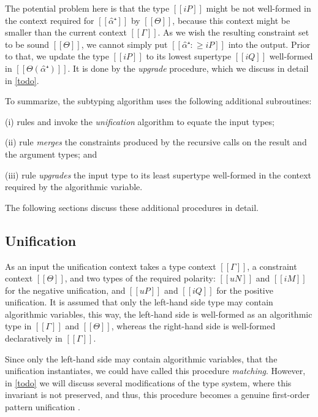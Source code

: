 The potential problem here is that the type $[[iP]]$
might be not well-formed in the context required for $[[α̂⁺]]$ by $[[Θ]]$, 
because this context might be smaller than the current context $[[Γ]]$.
As we wish the resulting constraint set to be sound \wrt $[[Θ]]$,
we cannot simply put $[[α̂⁺ :≥ iP]]$ into the output. 
Prior to that, we update the type $[[iP]]$ to its lowest supertype $[[iQ]]$
well-formed in $[[Θ(α̂⁺)]]$. It is done by the \emph{upgrade} procedure,
which we discuss in detail in \cref{todo}.

\vspace{\baselineskip}
To summarize, the subtyping algorithm uses the following additional subroutines:
\begin{enumerate*}[noitemsep]
  \item[(i)] rules  and
     invoke the \emph{unification} algorithm
    to equate the input types;
  \item[(ii)] rule  \emph{merges} the constraints
    produced by the recursive calls on the result and the argument types; and
  \item[(iii)] rule  \emph{upgrades} the input type
    to its least supertype well-formed in the context required by the
    algorithmic variable.
\end{enumerate*}
The following sections discuss these additional procedures in detail.

\subsection{Unification}

As an input the unification context 
takes a type context $[[Γ]]$, a constraint context $[[Θ]]$,
and two types of the required polarity:
$[[uN]]$ and  $[[iM]]$ for the negative unification, and
$[[uP]]$ and  $[[iQ]]$ for the positive unification.
It is assumed that only the left-hand side type may contain algorithmic variables,
this way, the left-hand side is well-formed as an algorithmic type in $[[Γ]]$ and 
$[[Θ]]$, whereas the right-hand side is well-formed declaratively in $[[Γ]]$.

Since only the left-hand side may contain algorithmic variables,
that the unification instantiates, we could have called this procedure \emph{matching}.
However, in \cref{todo} we will discuss several modifications of the 
type system, where this invariant is not preserved, and thus, this procedure
becomes a genuine first-order pattern unification \cite{miller1991:unification}.

